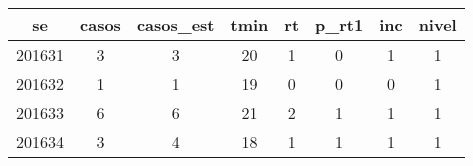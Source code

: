 \begin{tabular}{c|ccccccc}
  \hline
se & casos & casos\_est & tmin & rt & p\_rt1 & inc & nivel \\ 
  \hline
201631 & 3 & 3 & 20 & 1 & 0 & 1 & 1 \\ 
  201632 & 1 & 1 & 19 & 0 & 0 & 0 & 1 \\ 
  201633 & 6 & 6 & 21 & 2 & 1 & 1 & 1 \\ 
  201634 & 3 & 4 & 18 & 1 & 1 & 1 & 1 \\ 
   \hline
\end{tabular}
